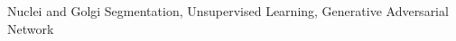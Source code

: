 \acresetall
\noindent Nuclei and Golgi Segmentation, Unsupervised Learning, Generative Adversarial Network